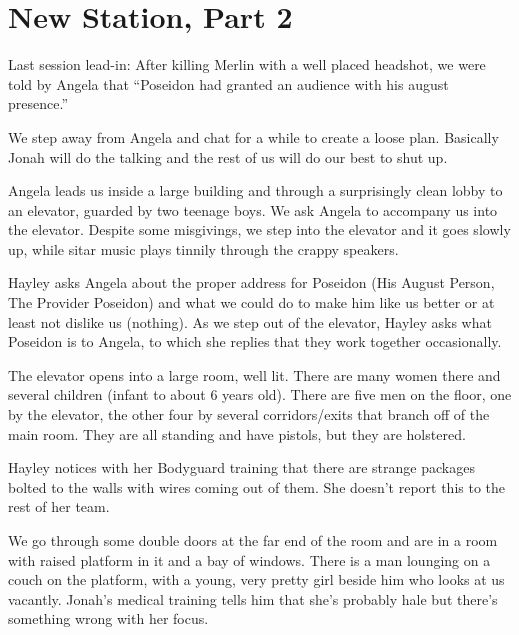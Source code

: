 \setcounter{chapter}{ 1 }
\chapter{\textbf{New Station, Part 2} }






\noindent\hrulefill





Last session lead-in: After killing Merlin with a well placed headshot, we were told by Angela that ``Poseidon had granted an audience with his august presence.''



We step away from Angela and chat for a while to create a loose plan.  Basically Jonah will do the talking and the rest of us will do our best to shut up.



Angela leads us inside a large building and through a surprisingly clean lobby to an elevator, guarded by two teenage boys.  We ask Angela to accompany us into the elevator.  Despite some misgivings, we step into the elevator and it goes slowly up, while sitar music plays tinnily through the crappy speakers.



Hayley asks Angela about the proper address for Poseidon (His August Person, The Provider Poseidon) and what we could do to make him like us better or at least not dislike us (nothing).  As we step out of the elevator, Hayley asks what Poseidon is to Angela, to which she replies that they work together occasionally.



The elevator opens into a large room, well lit.  There are many women there and several children (infant to about 6 years old).  There are five men on the floor, one by the elevator, the other four by several corridors/exits that branch off of the main room.  They are all standing and have pistols, but they are holstered.



Hayley notices with her Bodyguard training that there are strange packages bolted to the walls with wires coming out of them.  She doesn't report this to the rest of her team.



We go through some double doors at the far end of the room and are in a room with raised platform in it and a bay of windows.  There is a man lounging on a couch on the platform, with a young, very pretty girl beside him who looks at us vacantly.  Jonah's medical training tells him that she's probably hale but there's something wrong with her focus.



